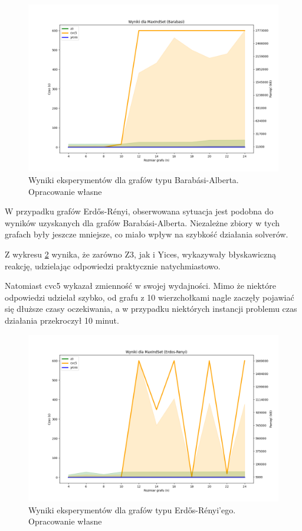 \begin{figure}[htbp]
	\centering
	\begin{minipage}{\textwidth}
		\includegraphics[width=\textwidth]{./figures/4-barabasi-plot.png}
		\caption{Wyniki eksperymentów dla grafów typu Barabási-Alberta. Opracowanie własne}
		\label{fig:4-barabasi-plot}
	\end{minipage}
\end{figure}

W przypadku grafów Erdős-Rényi, obserwowana sytuacja jest podobna do wyników uzyskanych dla grafów Barabási-Alberta. Niezależne zbiory w tych grafach były jeszcze mniejsze, co miało wpływ na szybkość działania solverów.

Z wykresu \ref{fig:4-erdos-renyi-plot} wynika, że zarówno Z3, jak i Yices, wykazywały błyskawiczną reakcję, udzielając odpowiedzi praktycznie natychmiastowo.

Natomiast cvc5 wykazał zmienność w swojej wydajności. Mimo że niektóre odpowiedzi udzielał szybko, od grafu z 10 wierzchołkami nagle zaczęły pojawiać się dłuższe czasy oczekiwania, a w przypadku niektórych instancji problemu czas działania przekroczył 10 minut.

\begin{figure}[htbp]
	\centering
	\begin{minipage}{\textwidth}
		\includegraphics[width=\textwidth]{./figures/4-erdos-renyi-plot.png}
		\caption{Wyniki eksperymentów dla grafów typu Erdős-Rényi'ego. Opracowanie własne}
		\label{fig:4-erdos-renyi-plot}
	\end{minipage}
\end{figure}

